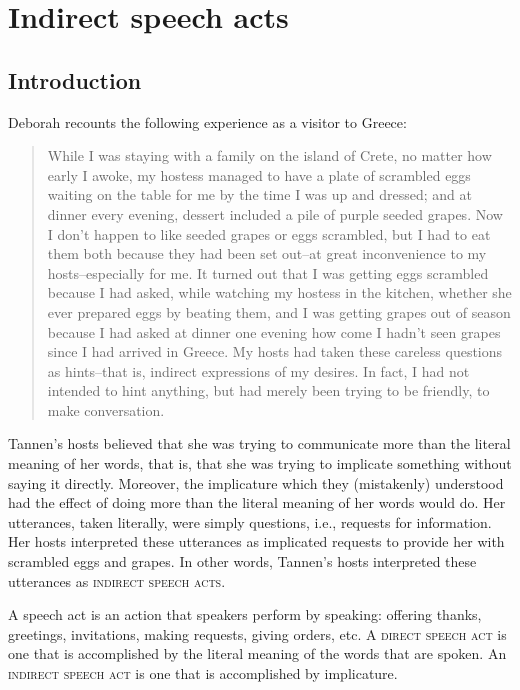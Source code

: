 \chapter{Indirect speech acts}\label{sec:10}

\section{Introduction}\label{sec:10.1}

Deborah \citet{Tannen1981} recounts the following experience as a visitor to Greece:


\begin{quote}
While I was staying with a family on the island of Crete, no matter how early I awoke, my hostess managed to have a plate of scrambled eggs waiting on the table for me by the time I was up and dressed; and at dinner every evening, dessert included a pile of purple seeded grapes. Now I don’t happen to like seeded grapes or eggs scrambled, but I had to eat them both because they had been set out–at great inconvenience to my hosts–especially for me. It turned out that I was getting eggs scrambled because I had asked, while watching my hostess in the kitchen, whether she ever prepared eggs by beating them, and I was getting grapes out of season because I had asked at dinner one evening how come I hadn’t seen grapes since I had arrived in Greece. My hosts had taken these careless questions as hints–that is, indirect expressions of my desires. In fact, I had not intended to hint anything, but had merely been trying to be friendly, to make conversation.
\end{quote}


Tannen’s hosts believed that she was trying to communicate more than the literal meaning of her words, that is, that she was trying to implicate something without saying it directly. Moreover, the implicature which they (mistakenly) understood had the effect of doing more than the literal meaning of her words would do. Her utterances, taken literally, were simply questions, i.e., requests for information. Her hosts interpreted these utterances as implicated requests to provide her with scrambled eggs and grapes. In other words, Tannen’s hosts interpreted these utterances as \textsc{indirect speech acts}.



A speech act is an action that speakers perform by speaking: offering thanks, greetings, invitations, making requests, giving orders, etc. A \textsc{direct speech act} is one that is accomplished by the literal meaning of the words that are spoken. An \textsc{indirect speech act} is one that is accomplished by implicature.



